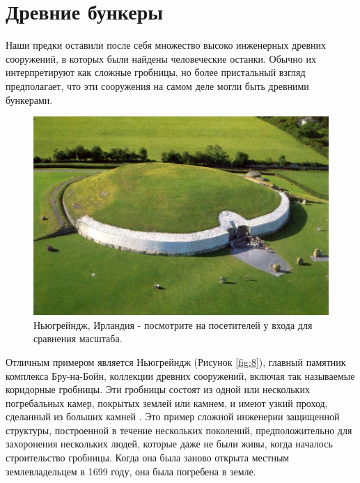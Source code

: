 \documentclass[10pt,twocolumn,letterpaper]{article}
\begin{document}
\section{Древние бункеры}

Наши предки оставили после себя множество высоко инженерных древних сооружений, в которых были найдены человеческие останки. Обычно их интерпретируют как сложные гробницы, но более пристальный взгляд предполагает, что эти сооружения на самом деле могли быть древними бункерами.

\begin{figure}[b]
\begin{center}
   \includegraphics[width=1\linewidth]{ww19.jpg}
\end{center}
   \caption{Ньюгрейндж, Ирландия - посмотрите на посетителей у входа для сравнения масштаба.}
\label{fig:8}
\label{fig:onecol}
\end{figure}

Отличным примером является Ньюгрейндж (Рисунок \ref{fig:8}), главный памятник комплекса Бру-на-Бойн, коллекции древних сооружений, включая так называемые коридорные гробницы. Эти гробницы состоят из одной или нескольких погребальных камер, покрытых землей или камнем, и имеют узкий проход, сделанный из больших камней \cite{70}. Это пример сложной инженерии защищенной структуры, построенной в течение нескольких поколений, предположительно для захоронения нескольких людей, которые даже не были живы, когда началось строительство гробницы. Когда она была заново открыта местным землевладельцем в 1699 году, она была погребена в земле.
\end{document}
